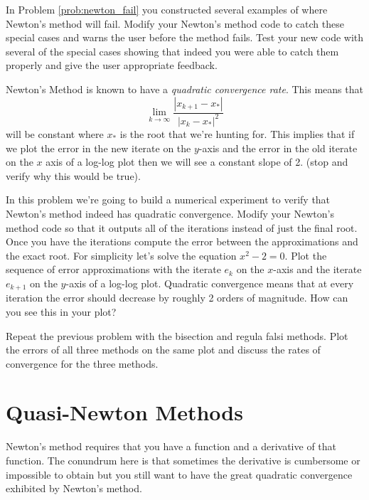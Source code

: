 \begin{problem}
    In Problem \ref{prob:newton_fail} you constructed several examples of where Newton's
    method will fail.  Modify your Newton's method code
    to catch these special cases and warns the user before the method fails.  Test your
    new code with several of the special cases showing that indeed you were able to catch
    them properly and give the user appropriate feedback.
\end{problem}


\begin{problem}\label{prob:newton_convergence}
    Newton's Method is known to have a {\it quadratic convergence rate}.  This means that 
    \[ \lim_{k \to \infty} \frac{|x_{k+1} - x_*|}{|x_k - x_*|^2} \]
    will be constant where $x_*$ is the root that we're hunting for.  This implies that
    if we plot the error in the new iterate on the $y$-axis and the error in the old
    iterate on the $x$ axis of a log-log plot then we will see a constant slope of 2.
    (stop and verify why this would be true).
    
    In this problem we're going to build a numerical experiment to verify that Newton's
    method indeed has quadratic convergence.  Modify your Newton's method code so that it
    outputs all of the iterations instead of just the final root.  Once you have the
    iterations compute the error between the approximations and the exact root. For
    simplicity let's solve the equation $x^2-2=0$.  Plot the sequence of error
    approximations with the iterate $e_k$ on the $x$-axis and the iterate $e_{k+1}$ on the
    $y$-axis of a log-log plot.  
    Quadratic convergence means that at every iteration the
    error should decrease by roughly 2 orders of magnitude.  How can you see this in your
    plot?
\end{problem}


\begin{problem}
    Repeat the previous problem with the bisection and regula falsi
    methods.  Plot the errors of all three methods on the same plot and discuss the rates
    of convergence for the three methods.
\end{problem}


\newpage\section{Quasi-Newton Methods}
Newton's method requires that you have a function and a derivative of that function.  The
conundrum here is that sometimes the derivative is cumbersome or impossible to obtain but
you still want to have the great quadratic convergence exhibited by Newton's method.

